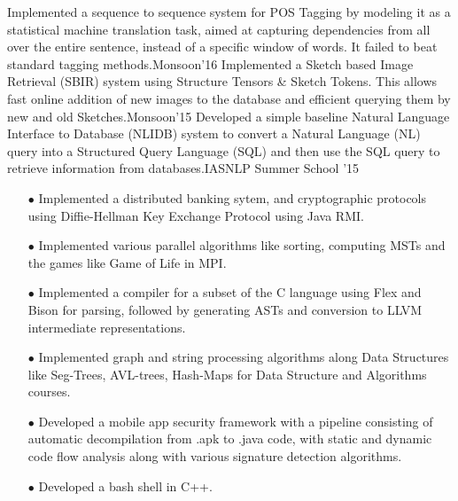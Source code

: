 \documentclass[letterpaper]{page3_formatting} %
\begin{document}
\begin{twenty}

	{Implemented a sequence to sequence system for POS Tagging by modeling it as a statistical machine translation task, aimed at capturing dependencies from all over the entire sentence, instead of a specific window of words. It failed to beat standard tagging  methods.}{Monsoon'16}
	{Implemented a Sketch based Image Retrieval (SBIR) system using Structure Tensors \& Sketch Tokens. This allows fast online addition of new images to the database and efficient querying them by new and old Sketches.}{Monsoon'15}
	{Developed a simple baseline Natural Language Interface to Database (NLIDB) system to convert a Natural Language (NL) query into a Structured Query Language (SQL) and then use the SQL query to retrieve information from databases.}{IASNLP Summer School '15}
   
	{
    \begin{enumerate}\vspace{0.15cm}
      \item[$\bullet$] Implemented a distributed banking sytem, and cryptographic protocols   using Diffie-Hellman Key Exchange Protocol using Java RMI.\vspace{0.1cm}
      \item[$\bullet$] Implemented various parallel algorithms like sorting, computing MSTs and the games like Game of Life in MPI.\vspace{0.1cm}
      \item[$\bullet$] Implemented a compiler for a subset of the C language using Flex and Bison for parsing, followed by generating ASTs and conversion to LLVM intermediate representations.\vspace{0.1cm}
      \item[$\bullet$] Implemented graph and string processing algorithms along Data Structures like Seg-Trees, AVL-trees, Hash-Maps for Data Structure and Algorithms courses.\vspace{0.1cm}
      \item[$\bullet$] Developed a mobile app security framework with a pipeline consisting of automatic decompilation from .apk to .java code, with static and dynamic code flow analysis along with various signature detection algorithms.\vspace{0.1cm}
      \item[$\bullet$] Developed a bash shell in C++.\vspace{0.1cm}
      

\end{enumerate}}
\end{twenty}
\end{document}
